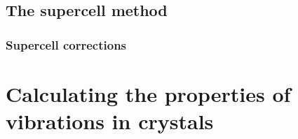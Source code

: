 \subsection{The supercell method}







\subsubsection{Supercell corrections}



\section{Calculating the properties of vibrations in crystals} \label{sec:latticedynamics}

